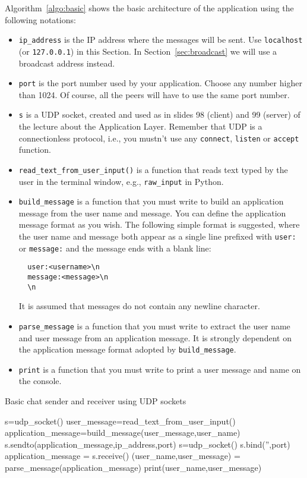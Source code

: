 \documentclass[11pt]{article}
\begin{document}
Algorithm~\ref{algo:basic} shows the basic architecture of the
application using the following notations:
\begin{itemize}
\item \texttt{ip\_address} is the IP address where the messages will
  be sent. Use \texttt{localhost} (or \texttt{127.0.0.1}) in this
  Section. In Section~\ref{sec:broadcast} we will use a broadcast
  address instead.
  \item \texttt{port} is the port number used by your application. Choose any
    number higher than 1024. Of course, all the peers will have to use
    the same port number.
  \item \texttt{s} is a UDP socket, created and used as in slides 98
    (client) and 99 (server) of the lecture about the Application
    Layer. Remember that UDP is a connectionless protocol, i.e., you
    mustn't use any \texttt{connect}, \texttt{listen} or
    \texttt{accept} function.
    \item \texttt{read\_text\_from\_user\_input()} is a function that
      reads text typed by the user in the terminal window, e.g.,
      \texttt{raw\_input} in Python.
    \item \texttt{build\_message} is a function that you must write to
      build an application message from the user name and message. You
      can define the application message format as you wish. The following simple format is suggested, where the user name and message both appear as a single line prefixed with \texttt{user:} or \texttt{message:} and the message ends with a blank line:
\begin{verbatim}
  user:<username>\n
  message:<message>\n
  \n
\end{verbatim}
It is assumed that messages do not contain any newline character.
\item \texttt{parse\_message} is a function that you must write to extract the user name and user message from an application message. It is strongly dependent on the application message format adopted by \texttt{build\_message}.
\item \texttt{print} is a function that you must write to print a user message and name on the console. 
\end{itemize}
\begin{algorithm}[htb]
  \caption{Basic chat sender and receiver using UDP sockets}
  \label{algo:basic}
\begin{algorithmic}[1]
  \State s=udp\_socket()
  \State user\_message=read\_text\_from\_user\_input()
  \State application\_message=build\_message(user\_message,user\_name)
  \State s.sendto(application\_message,ip\_address,port)
  \EndWhile
  \EndProcedure
  \State s=udp\_socket()
  \State s.bind('',port)
  \State application\_message = s.receive()
  \State (user\_name,user\_message) = parse\_message(application\_message)
  \State print(user\_name,user\_message)
  \EndWhile
  \EndProcedure
\end{algorithmic}
\end{algorithm}
\end{document}
